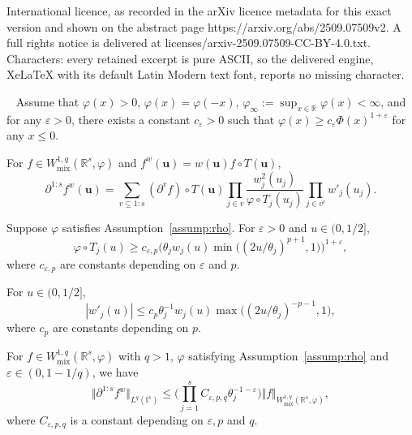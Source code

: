 \documentclass[10pt,a4paper]{amsart}
\newcommand{\bsu}{\boldsymbol{u}}
\newcommand{\itr}{\mathbb{I}}
\newcommand{\mix}{\mathrm{mix}}
\newcommand{\real}{\mathbb{R}}
\begin{document}
International licence, as recorded in the arXiv licence metadata for this exact version and shown on the abstract page https://arxiv.org/abs/2509.07509v2. A full rights notice is delivered at licenses/arxiv-2509.07509-CC-BY-4.0.txt. Characters: every retained excerpt is pure ASCII, so the delivered engine, XeLaTeX with its default Latin Modern text font, reports no missing character.
\begin{assumption}~\label{assump:rho}
Assume that $\varphi(x)>0$, $\varphi(x)=\varphi(-x)$, $\varphi_\infty:=\sup_{x\in \real} \varphi(x)<\infty$, and for any $\varepsilon>0$, there exists a constant $c_\varepsilon>0$ such that
$\varphi(x)\geq c_\varepsilon \Phi(x)^{1+\varepsilon}$ for any $x\le 0$. 
\end{assumption}

\begin{lemma}\label{lem:dfw}
    For $f\in W^{1,q}_{\mix}(\real^s,\varphi)$ and $f^w(\bsu)=w(\bsu)f\circ T(\bsu)$,
    $$\partial^{1{:}s} f^w (\bsu) =\sum_{v\subseteq 1{:}s}(\partial^{v} f) \circ T(\bsu) \prod_{j\in v} \frac{w^2_j(u_j)}{\varphi\circ T_j(u_j)}\prod_{j\in v^c} w'_j(u_j).$$
\end{lemma}

\begin{lemma}\label{lem:rhoTbound}
    Suppose $\varphi$ satisfies Assumption~\ref{assump:rho}. For $\varepsilon>0$ and $u\in (0,1/2]$,
    $$\varphi\circ T_j(u)\geq 
       c_{\varepsilon,p} \Big(  \theta_jw_{j}(u)\min\big((2u/\theta_j)^{p+1},1 \big)\Big)^{1+\varepsilon},$$
    where $c_{\varepsilon,p}$ are constants depending on $\varepsilon$ and $p$.
\end{lemma}

\begin{lemma}\label{lem:dwjbound}
    For $u\in (0,1/2]$,
    $$|w'_j(u)|\leq 
      c_p  \theta^{-1}_j w_j(u) \max\big( (2u/\theta_j)^{-p-1},1\big),$$
    where $c_{p}$ are constants depending on $p$.
\end{lemma}

\begin{theorem}\label{thm:Wqcase}
    For $f\in W^{1,q}_{\mix}(\real^s,\varphi)$ with $q>1$, $\varphi$ satisfying Assumption~\ref{assump:rho} and $\varepsilon\in (0,1-1/q)$, we have
    $$\Vert\partial^{1{:}s} f^w \Vert_{L^q(\itr^s)}\leq  \Big(\prod_{j=1}^sC_{\varepsilon,p,q}\theta^{-1-\varepsilon}_j\Big)\Vert f \Vert_{W^{1,q}_{\mix}(\real^s,\varphi)},$$
    where $C_{\varepsilon,p,q}$ is a constant depending on $\varepsilon,p$ and $q$.
\end{theorem}
\end{document}
